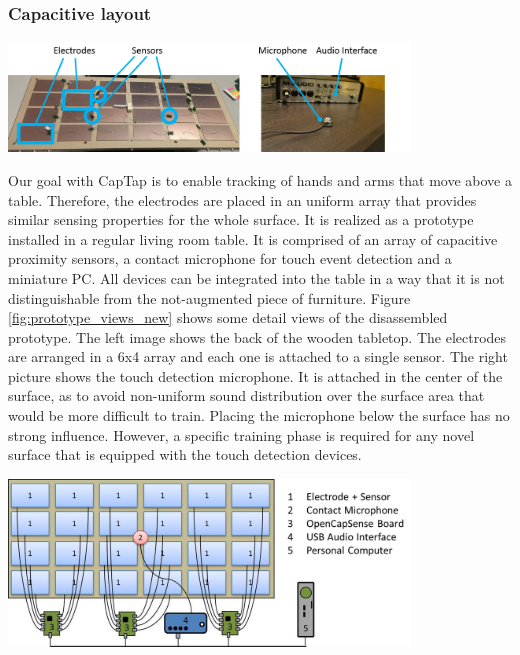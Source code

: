 \subsubsection{Capacitive layout}
\begin{minipage}{\linewidth}
\centering
\includegraphics[width=0.8\textwidth]{images/prototype_views_new}
\label{fig:prototype_views_new}
\end{minipage}	
 
Our goal with CapTap is to enable tracking of hands and arms that move above a table. Therefore, the electrodes are placed in an uniform array that provides similar sensing properties for the whole surface. It is realized as a prototype installed in a regular living room table. It is comprised of an array of capacitive proximity sensors, a contact microphone for touch event detection and a miniature PC. All devices can be integrated into the table in a way that it is not distinguishable from the not-augmented piece of furniture. Figure \ref{fig:prototype_views_new} shows some detail views of the disassembled prototype. The left image shows the back of the wooden tabletop. The electrodes are arranged in a 6x4 array and each one is attached to a single sensor. The right picture shows the touch detection microphone. It is attached in the center of the surface, as to avoid non-uniform sound distribution over the surface area that would be more difficult to train. Placing the microphone below the surface has no strong influence. However, a specific training phase is required for any novel surface that is equipped with the touch detection devices. 

\begin{minipage}{\linewidth}
\centering
\includegraphics[width=0.8\textwidth]{images/captap_schematics}
\label{fig:captap_schematics}
\end{minipage}

